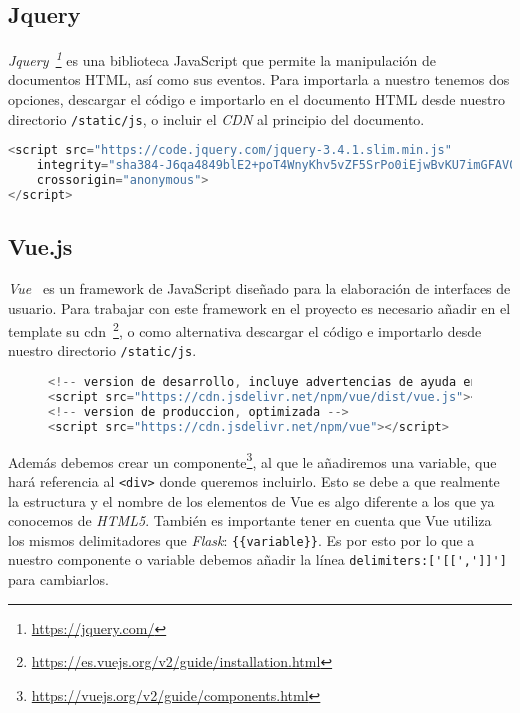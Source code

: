 \subsection{Jquery}\label{cap:jquery}
\textit{Jquery~\footnote{\url{https://jquery.com/}}} es una biblioteca JavaScript que permite la manipulación de documentos HTML, así como sus eventos. Para importarla a nuestro tenemos dos opciones, descargar el código e importarlo en el documento HTML desde nuestro directorio \verb|/static/js|, o incluir el \textit{CDN} al principio del documento.
\renewcommand{\lstlistingname}{Jquery}
\renewcommand{\lstlistlistingname}{List of \lstlistingname s}
\begin{lstlisting}[language=javascript,caption={Jquery cdn.}]
<script src="https://code.jquery.com/jquery-3.4.1.slim.min.js"
	integrity="sha384-J6qa4849blE2+poT4WnyKhv5vZF5SrPo0iEjwBvKU7imGFAV0wwj1yYfoRSJoZ+n"
	crossorigin="anonymous">
</script>
\end{lstlisting}

\subsection{Vue.js}\label{cap:Vue}
\textit{Vue}~\cite{doc:vue} es un framework de JavaScript diseñado para la elaboración de interfaces de usuario. Para trabajar con este framework en el proyecto es necesario añadir en el template su cdn~\footnote{\url{https://es.vuejs.org/v2/guide/installation.html}}, o como alternativa descargar el código e importarlo desde nuestro directorio \verb|/static/js|.
\renewcommand{\lstlistingname}{Vue.js}
\renewcommand{\lstlistlistingname}{List of \lstlistingname s}
\begin{figure}
\begin{lstlisting}[language=javascript,caption={Vue cdn.}]
<!-- version de desarrollo, incluye advertencias de ayuda en la consola -->
<script src="https://cdn.jsdelivr.net/npm/vue/dist/vue.js"></script>
<!-- version de produccion, optimizada -->
<script src="https://cdn.jsdelivr.net/npm/vue"></script>
\end{lstlisting}
\end{figure}

Además debemos crear un componente\footnote{\url{https://vuejs.org/v2/guide/components.html}}, al que le añadiremos una variable, que hará referencia al \verb|<div>| donde queremos incluirlo. Esto se debe a que realmente la estructura y el nombre de los elementos de Vue es algo diferente a los que ya conocemos de \textit{HTML5}. También es importante tener en cuenta que Vue utiliza los mismos delimitadores que \textit{Flask}: \verb|{{variable}}|. Es por esto por lo que a nuestro componente o variable debemos añadir la línea \verb|delimiters:['[[',']]']| para cambiarlos.

